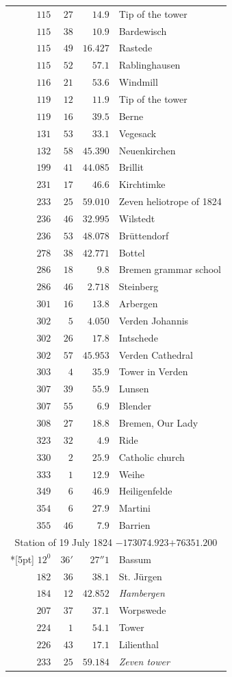 \begin{longtable}{@{}rrrp{.61\linewidth}@{}}
\(115\)&\(27\)&\(14.9\)&\raggedright Tip of the tower\tabularnewline
\(115\)&\(38\)&\(10.9\)&\raggedright Bardewisch\tabularnewline
\(115\)&\(49\)&\(16.427\)&\raggedright Rastede\tabularnewline
\(115\)&\(52\)&\(57.1\)&\raggedright Rablinghausen\tabularnewline
\(116\)&\(21\)&\(53.6\)&\raggedright Windmill\tabularnewline
\(119\)&\(12\)&\(11.9\)&\raggedright Tip of the tower\tabularnewline
\(119\)&\(16\)&\(39.5\)&\raggedright Berne\tabularnewline
\(131\)&\(53\)&\(33.1\)&\raggedright Vegesack\tabularnewline
\(132\)&\(58\)&\(45.390\)&\raggedright Neuenkirchen\tabularnewline
\(199\)&\(41\)&\(44.085\)&\raggedright Brillit\tabularnewline
\(231\)&\(17\)&\(46.6\)&\raggedright Kirchtimke\tabularnewline
\(233\)&\(25\)&\(59.010\)&\raggedright Zeven heliotrope of 1824\tabularnewline
\(236\)&\(46\)&\(32.995\)&\raggedright Wilstedt\tabularnewline
\(236\)&\(53\)&\(48.078\)&\raggedright Brüttendorf\tabularnewline
\(278\)&\(38\)&\(42.771\)&\raggedright Bottel\tabularnewline
\(286\)&\(18\)&\(9.8\)&\raggedright Bremen grammar school\tabularnewline
\(286\)&\(46\)&\(2.718\)&\raggedright Steinberg\tabularnewline
\(301\)&\(16\)&\(13.8\)&\raggedright Arbergen\tabularnewline
\(302\)&\(5\)&\(4.050\)&\raggedright Verden Johannis\tabularnewline
\(302\)&\(26\)&\(17.8\)&\raggedright Intschede\tabularnewline
\(302\)&\(57\)&\(45.953\)&\raggedright Verden Cathedral\tabularnewline
\(303\)&\(4\)&\(35.9\)&\raggedright Tower in Verden\tabularnewline
\(307\)&\(39\)&\(55.9\)&\raggedright Lunsen\tabularnewline
\(307\)&\(55\)&\(6.9\)&\raggedright Blender\tabularnewline
\(308\)&\(27\)&\(18.8\)&\raggedright Bremen, Our Lady\tabularnewline
\(323\)&\(32\)&\(4.9\)&\raggedright Ride\tabularnewline
\(330\)&\(2\)&\(25.9\)&\raggedright Catholic church\tabularnewline
\(333\)&\(1\)&\(12.9\)&\raggedright Weihe\tabularnewline
\(349\)&\(6\)&\(46.9\)&\raggedright Heiligenfelde\tabularnewline
\(354\)&\(6\)&\(27.9\)&\raggedright Martini\tabularnewline
\(355\)&\(46\)&\(7.9\)&\raggedright Barrien\tabularnewline
\multicolumn{4}{c}{Station of 19 July 1824 \(-173074.923\)\qquad\(+76351.200\)}\\*[5pt]
\(12^{0}\)&\(36'\)&\(27''1\)&\raggedright Bassum\tabularnewline
\(182\)&\(36\)&\(38.1\)&\raggedright St. Jürgen\tabularnewline
\(184\)&\(12\)&\(42.852\)&\raggedright \textit{Hambergen}\tabularnewline
\(207\)&\(37\)&\(37.1\)&\raggedright Worpswede\tabularnewline
\(224\)&\(1\)&\(54.1\)&\raggedright Tower\tabularnewline
\(226\)&\(43\)&\(17.1\)&\raggedright Lilienthal\tabularnewline
\(233\)&\(25\)&\(59.184\)&\raggedright \textit{Zeven tower}\tabularnewline
\end{longtable}
\endgroup
